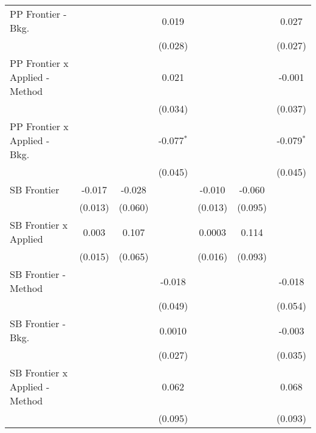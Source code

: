 \begin{tabular}{lcccccc}
   PP Frontier - Bkg.             &               &              & 0.019         &               &              & 0.027\\   
                                  &               &              & (0.028)       &               &              & (0.027)\\   
   PP Frontier x Applied - Method &               &              & 0.021         &               &              & -0.001\\   
                                  &               &              & (0.034)       &               &              & (0.037)\\   
   PP Frontier x Applied - Bkg.   &               &              & -0.077$^{*}$  &               &              & -0.079$^{*}$\\   
                                  &               &              & (0.045)       &               &              & (0.045)\\   
   SB Frontier                    & -0.017        & -0.028       &               & -0.010        & -0.060       &   \\   
                                  & (0.013)       & (0.060)      &               & (0.013)       & (0.095)      &   \\   
   SB Frontier x Applied          & 0.003         & 0.107        &               & 0.0003        & 0.114        &   \\   
                                  & (0.015)       & (0.065)      &               & (0.016)       & (0.093)      &   \\   
   SB Frontier - Method           &               &              & -0.018        &               &              & -0.018\\   
                                  &               &              & (0.049)       &               &              & (0.054)\\   
   SB Frontier - Bkg.             &               &              & 0.0010        &               &              & -0.003\\   
                                  &               &              & (0.027)       &               &              & (0.035)\\   
   SB Frontier x Applied - Method &               &              & 0.062         &               &              & 0.068\\   
                                  &               &              & (0.095)       &               &              & (0.093)\\   

\end{tabular}
